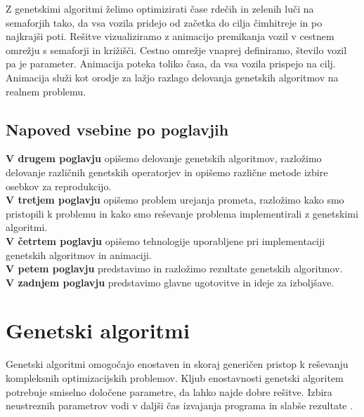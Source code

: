 \documentclass[a4paper, 12pt]{book}
\begin{document}
Z genetskimi algoritmi \v zelimo optimizirati \v case rde\v cih in zelenih lu\v ci na semaforjih tako, da vsa vozila pridejo od za\v cetka do cilja \v cimhitreje in po najkraj\v si poti. Re\v sitve vizualiziramo z animacijo premikanja vozil v cestnem omre\v zju s semaforji in kri\v zi\v s\v ci. Cestno omre\v zje vnaprej definiramo, \v stevilo vozil pa je parameter. Animacija poteka toliko \v casa, da vsa  vozila prispejo na cilj. Animacija slu\v zi kot orodje za la\v zjo razlago delovanja genetskih algoritmov na realnem problemu.

\section{Napoved vsebine po poglavjih}
\textbf{V drugem poglavju} opi\v semo delovanje genetskih algoritmov, razlo\v zimo delovanje razli\v cnih genetskih operatorjev in opi\v semo razli\v cne metode izbire osebkov za reprodukcijo.\\
\textbf{V tretjem poglavju} opi\v semo problem urejanja prometa, razlo\v zimo kako smo pristopili k problemu in kako smo re\v sevanje problema implementirali z genetskimi algoritmi.\\
\textbf{V \v cetrtem poglavju} opi\v semo tehnologije uporabljene pri implementaciji genetskih algoritmov in animaciji.\\
\textbf{V petem poglavju} predstavimo in razlo\v zimo rezultate genetskih algoritmov.\\
\textbf{V zadnjem poglavju} predstavimo glavne ugotovitve in ideje za izbolj\v save.

\chapter{Genetski algoritmi}
\label{ch1}
Genetski algoritmi omogo\v cajo enostaven in skoraj generi\v cen pristop k re\v sevanju kompleksnih optimizacijskih problemov. Kljub enostavnosti genetski algoritem potrebuje smiselno dolo\v cene parametre, da lahko najde dobre re\v sitve. Izbira neustreznih parametrov vodi v dalj\v si \v cas izvajanja programa in slab\v se rezultate
\cite{sarmady}.
\end{document}

